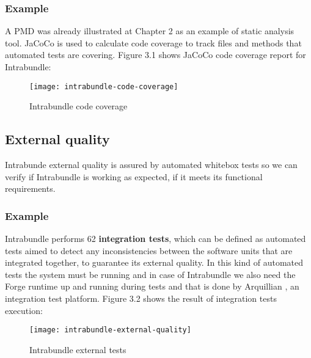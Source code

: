 \subsubsection{Example}
 A PMD was already illustrated at Chapter 2 as an example of static analysis tool. JaCoCo is used to calculate code coverage to track files and methods that automated tests are covering. Figure 3.1 shows JaCoCo code coverage report for Intrabundle:

\begin{figure}[h]
\caption{Intrabundle code coverage}
\texttt{[image: intrabundle-code-coverage]}
\end{figure}

\FloatBarrier

\subsection{External quality}
Intrabunde external quality is assured by automated whitebox tests so we can verify if Intrabundle is working as expected, if it meets its functional requirements.

\subsubsection{Example}
Intrabundle performs 62 \textbf{integration tests}, which can be defined as automated tests aimed to detect any inconsistencies between the software units that are integrated together, to guarantee its external quality. In this kind of automated tests the system must be running and in case of Intrabundle we also need the Forge runtime up and running during tests and that is done by Arquillian \citep{dan2011}, an integration test platform. Figure 3.2 shows the result of integration tests execution:

\begin{figure}[h]
\caption{Intrabundle external tests}
\texttt{[image: intrabundle-external-quality]}
\end{figure}

\FloatBarrier